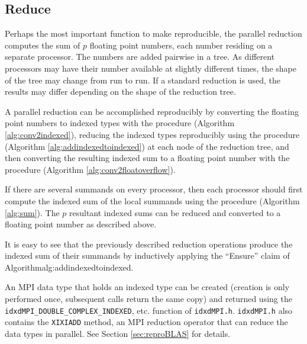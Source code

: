 \subsection{Reduce}
  \label{sec:compositeops_reduce}
  Perhaps the most important function to make reproducible, the parallel reduction computes the sum of $p$ floating point numbers, each number residing on a separate processor. The numbers are added pairwise in a tree. As different processors may have their number available at slightly different times, the shape of the tree may change from run to run. If a standard reduction is used, the results may differ depending on the shape of the reduction tree.

  A parallel reduction can be accomplished reproducibly by converting the floating point numbers to indexed types with the  procedure (Algorithm \ref{alg:conv2indexed}), reducing the indexed types reproducibly using the  procedure (Algorithm \ref{alg:addindexedtoindexed}) at each node of the reduction tree, and then converting the resulting indexed sum to a floating point number with the  procedure (Algorithm \ref{alg:conv2floatoverflow}). 

  If there are several summands on every processor, then each processor should first compute the indexed sum of the local summands using the  procedure (Algorithm \ref{alg:sum}). The $p$ resultant indexed sums can be reduced and converted to a floating point number as described above.

  It is easy to see that the previously described reduction operations produce the indexed sum of their summands by inductively applying the ``Ensure'' claim of Algorithm{alg:addindexedtoindexed}.

  An MPI data type that holds an indexed type can be created (creation is only performed once, subsequent calls return the same copy) and returned using the \texttt{idxdMPI\_DOUBLE\_COMPLEX\_INDEXED}, etc. function of \texttt{idxdMPI.h}. \texttt{idxdMPI.h} also contains the \texttt{XIXIADD} method, an MPI reduction operator that can reduce the data types in parallel. See Section \ref{sec:reproBLAS} for details.
